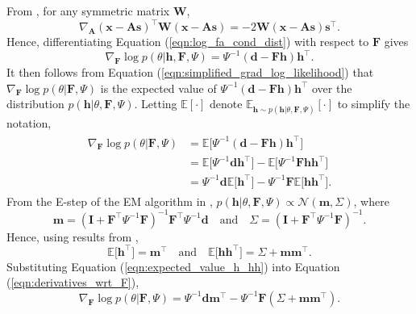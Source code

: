 \documentclass[msc,deptreport.inf]{infthesis} %
\newcommand{\matr}[1]{\mathbf{#1}}
\newcommand{\E}{\mathbb E}
\begin{document}
From \cite{petersen2012}, for any symmetric matrix $\matr{W}$,
\begin{equation}
	\nabla_{\matr{A}} (\matr{x} - \matr{As})^\intercal \matr{W} (\matr{x} - \matr{As}) = -2 \matr{W} (\matr{x} - \matr{As}) \matr{s}^\intercal.
\end{equation}
Hence, differentiating Equation (\ref{eqn:log_fa_cond_dist}) with respect to $\matr{F}$ gives
\begin{equation}
	\nabla_{\matr{F}} \log p(\theta | \matr{h}, \matr{F}, \Psi)
	= \Psi^{-1} (\matr{d} - \matr{Fh}) \matr{h}^\intercal.
\end{equation}
It then follows from Equation (\ref{eqn:simplified_grad_log_likelihood}) that $\nabla_{\matr{F}} \log p(\theta | \matr{F}, \Psi)$ is the expected value of $\Psi^{-1} (\matr{d} - \matr{Fh}) \matr{h}^\intercal$ over the distribution $p(\matr{h} | \theta, \matr{F}, \Psi)$. Letting $\E[\cdot]$ denote $\E_{\matr{h} \sim p(\matr{h} | \theta, \matr{F}, \Psi)}[\cdot]$ to simplify the notation, 
\begin{align}\label{eqn:derivatives_wrt_F}
\begin{split}
	\nabla_{\matr{F}} \log p(\theta | \matr{F}, \Psi) 
	& = \E \big[ \Psi^{-1} (\matr{d} - \matr{Fh}) \matr{h}^\intercal \big] \\
	& = \E \big[ \Psi^{-1} \matr{d} \matr{h}^\intercal \big] 
	- \E \big[ \Psi^{-1} \matr{Fh} \matr{h}^\intercal \big] \\
	& = \Psi^{-1} \matr{d} \E \big[ \matr{h}^\intercal \big] 
	- \Psi^{-1} \matr{F}  \E \big[ \matr{h} \matr{h}^\intercal \big].
\end{split}
\end{align} 
From the E-step of the EM algorithm in \cite{barber2007}, $p(\matr{h} | \theta, \matr{F}, \Psi) \propto \mathcal{N}(\matr{m}, \Sigma)$, where
\begin{equation}\label{eqn:variational_params}
	\matr{m} = (\matr{I} + \matr{F}^\intercal \Psi^{-1} \matr{F})^{-1} \matr{F}^\intercal \Psi^{-1} \matr{d}
	\quad \text{and} \quad \Sigma = (\matr{I} + \matr{F}^\intercal \Psi^{-1} \matr{F})^{-1}.
\end{equation}
Hence, using results from \cite{petersen2012}, 
\begin{equation}\label{eqn:expected_value_h_hh}
	\E \big[ \matr{h}^\intercal \big] = \matr{m}^\intercal \quad \text{and} \quad \E \big[ \matr{h} \matr{h}^\intercal \big] = \Sigma + \matr{m} \matr{m}^\intercal.
\end{equation}
Substituting Equation (\ref{eqn:expected_value_h_hh}) into Equation (\ref{eqn:derivatives_wrt_F}), 
\begin{equation}
	\nabla_{\matr{F}} \log p(\theta | \matr{F}, \Psi) 
	= \Psi^{-1} \matr{d} \matr{m}^\intercal
	- \Psi^{-1} \matr{F}  (\Sigma + \matr{m} \matr{m}^\intercal).
\end{equation}
\end{document}
